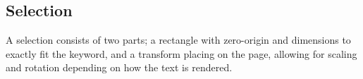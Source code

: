 \documentclass[12pt,a4paper]{article}
\begin{document}
\subsection{Selection}

A selection consists of two parts; a rectangle with zero-origin and dimensions to exactly fit the keyword, and a transform placing on the page, allowing for scaling and rotation depending on how the text is rendered.
\end{document}
